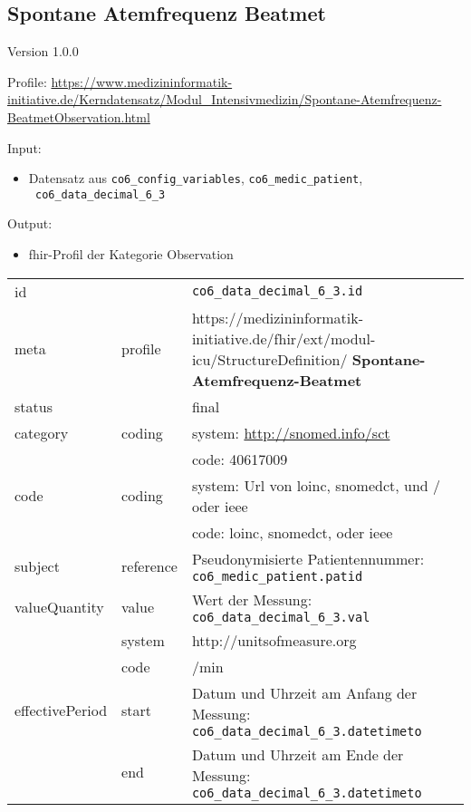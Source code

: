 \subsection{Spontane Atemfrequenz Beatmet} 
\noindent Version 1.0.0

\noindent Profile: \url{https://www.medizininformatik-initiative.de/Kerndatensatz/Modul_Intensivmedizin/Spontane-Atemfrequenz-BeatmetObservation.html}

\noindent Input:
\begin{itemize}
	\item Datensatz aus \texttt{co6\_config\_variables}, \texttt{co6\_medic\_patient}, \\ \texttt{
co6\_data\_decimal\_6\_3}
\end{itemize}
Output:
\begin{itemize}
        \item \ac{fhir}-Profil der Kategorie \glqq Observation\grqq{}
\end{itemize}
\begin{longtable}{|l|l|p{7.5cm}|}
        \hline
        \rowcolor{lightgray} \multicolumn{3}{|l|}{Data Mapping (inhaltlich)} \\ \hline
        id &  & \texttt{co6\_data\_decimal\_6\_3.id} \\ \hline
	meta & profile & https://medizininformatik-initiative.de/fhir/ext/modul-icu/StructureDefinition/\textbf{
Spontane-Atemfrequenz-Beatmet} \\ \hline 
	status &  & final  \\ \hline 
	category & coding & system: \url{http://snomed.info/sct} \\
\cline{3-3}
	& & code: 40617009 \\ \hline
	code & coding & system: Url von \ac{loinc}, \ac{snomedct}, und / oder \ac{ieee} \\ 
	\cline{3-3} 
	 &  & code: \ac{loinc}, \ac{snomedct}, oder \ac{ieee} \\ \hline
	subject & reference & Pseudonymisierte Patientennummer: \texttt{co6\_medic\_patient.patid} \\ \hline
	valueQuantity & value & Wert der Messung: \texttt{
co6\_data\_decimal\_6\_3.val} \\
        \cline{2-3}
         & system & http://unitsofmeasure.org \\
         \cline{2-3}
         & code & /min \\ \hline
    effectivePeriod & start & Datum und Uhrzeit am Anfang der Messung: \texttt{
co6\_data\_decimal\_6\_3.datetimeto} \\
    \cline{2-3}
     & end & Datum und Uhrzeit am Ende der Messung: \texttt{
co6\_data\_decimal\_6\_3.datetimeto} \\ \hline
\end{longtable}


